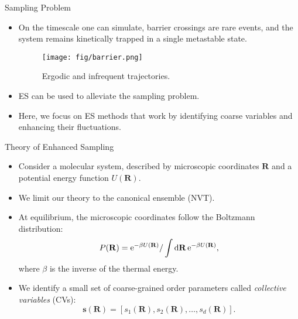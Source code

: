 \documentclass[10pt]{beamer}
\begin{document}
\begin{frame}{Sampling Problem}
\begin{itemize}
\setlength\itemsep{1em}
  \item On the timescale one can simulate, barrier crossings are rare events, and the system remains kinetically trapped in a single metastable state.
  \begin{figure}
    \texttt{[image: fig/barrier.png]}
    \caption{Ergodic and infrequent trajectories.}
  \end{figure}

  \item ES can be used to alleviate the sampling problem.

  \item Here, we focus on ES methods that work by identifying coarse variables and enhancing their fluctuations.
\end{itemize}
\end{frame}

\begin{frame}{Theory of Enhanced Sampling}
\begin{itemize}
\setlength\itemsep{1em}
  \item Consider a molecular system, described by microscopic coordinates $\mathbf{R}$ and a potential energy function $U(\mathbf{R})$.

  \item We limit our theory to the canonical ensemble (NVT).

  \item At equilibrium, the microscopic coordinates follow the Boltzmann distribution:
  \begin{equation}
    P(\mathbf{R}) = \mathrm{e}^{-\beta U(\mathbf{R})}/\int \mathrm{d}\mathbf{R} \,\mathrm{e}^{-\beta U(\mathbf{R})},
  \label{eq:pr}
  \end{equation}
  where $\beta$ is the inverse of the thermal energy.

  \item We identify a small set of coarse-grained order parameters called \textit{collective variables} (CVs):
  \begin{equation}
    \mathbf{s}(\mathbf{R}) = [s_1(\mathbf{R}), s_2(\mathbf{R}), \ldots, s_d(\mathbf{R})].
  \end{equation}
\end{itemize}
\end{frame}
\end{document}
